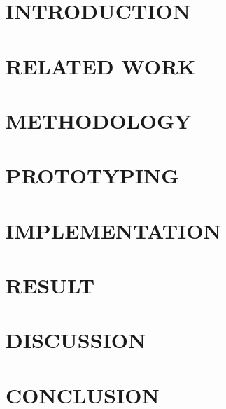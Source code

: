\documentclass[12pt, twoside]{report}
\begin{document}
\chapter{INTRODUCTION}
\setcounter{page}{1}


\chapter{RELATED WORK}


\chapter{METHODOLOGY}


\chapter{PROTOTYPING}


\chapter{IMPLEMENTATION}

	
\chapter{RESULT}

	
\chapter{DISCUSSION}

	
\chapter{CONCLUSION}




\end{document}
